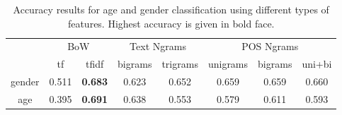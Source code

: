 \documentclass[a4paper]{llncs}
\begin{document}
\begin{table}[]
\centering
\begin{tabular}{|l|cc|cc|ccc|}
\hline
\multirow{2}{*}{}            & \multicolumn{2}{c|}{BoW} & \multicolumn{2}{c|}{Text Ngrams} & \multicolumn{3}{c|}{POS Ngrams} \\ %
                             & tf     & tfidf           & bigrams        & trigrams        & unigrams   & bigrams  & uni+bi  \\ \hline
\multicolumn{1}{|c|}{gender} & 0.511  & \textbf{0.683}  & 0.623          & 0.652           & 0.659      & 0.659    & 0.660   \\ %
\multicolumn{1}{|c|}{age}    & 0.395  & \textbf{0.691}  & 0.638          & 0.553           & 0.579      & 0.611    & 0.593   \\ \hline
\end{tabular}
\caption{Accuracy results for age and gender classification using different types of features. Highest accuracy is given in bold face.}
\label{table:DiffFeaturesResults}
\end{table}


\end{document}
